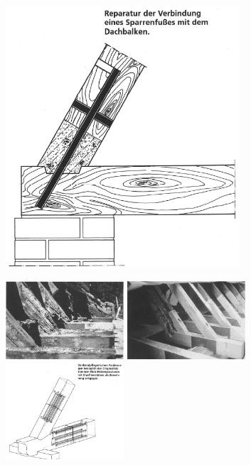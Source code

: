 \documentclass[fleqn,twoside]{article}
\begin{document}
\begin{minipage}{0.5\textwidth}
                \includegraphics[width=0.65\textwidth]{Grafiken/Denkmalpflegerische Arbeit/Prothesen/Prothesen 4.png}\\
            \end{minipage}
                \includegraphics[width=0.33\textwidth]{Grafiken/Denkmalpflegerische Arbeit/Prothesen/Prothesen 5.png}
                \includegraphics[width=0.33\textwidth]{Grafiken/Denkmalpflegerische Arbeit/Prothesen/Prothesen 5 - 2.png}
                \includegraphics[width=0.33\textwidth]{Grafiken/Denkmalpflegerische Arbeit/Prothesen/Prothesen 6.png}\\
            \vspace{5mm}
            
\end{document}
